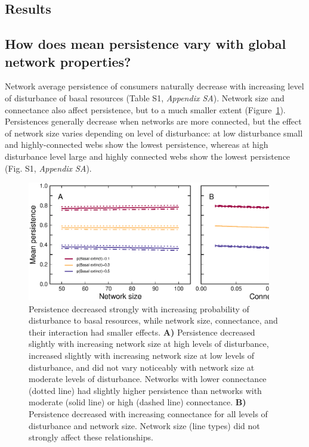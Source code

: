\documentclass[12pt]{article}
\begin{document}
\begin{spacing}{2.0}
\section*{Results}

    \subsection*{How does mean persistence vary with global network properties?}
    
        Network average persistence of consumers naturally decrease with increasing level of disturbance of basal resources (Table S1, \emph{Appendix SA}). Network size and connectance also affect persistence, but to a much smaller extent (Figure~\ref{fig:lm_CS}). Persistences generally decrease when networks are more connected, but the effect of network size varies depending on level of disturbance: at low disturbance small and highly-connected webs show the lowest persistence, whereas at high disturbance level large and highly connected webs show the lowest persistence (Fig. S1, \emph{Appendix SA}).

        \begin{figure}[h!]
            \centering
            \includegraphics[width=0.95\textwidth]{figures/persistence_vs_SC_lm.eps}
            \caption{Persistence decreased strongly with increasing probability of disturbance to basal resources, while network size, connectance, and their interaction had smaller effects. \textbf{A)} Persistence decreased slightly with increasing network size at high levels of disturbance, increased slightly with increasing network size at low levels of disturbance, and did not vary noticeably with network size at moderate levels of disturbance. Networks with lower connectance (dotted line) had slightly higher persistence than networks with moderate (solid line) or high (dashed line) connectance.
            \textbf{B)} Persistence decreased with increasing connectance for all levels of disturbance and network size. Network size (line types) did not strongly affect these relationships.}
            \label{fig:lm_CS}
        \end{figure}



\end{spacing}
\end{document}
